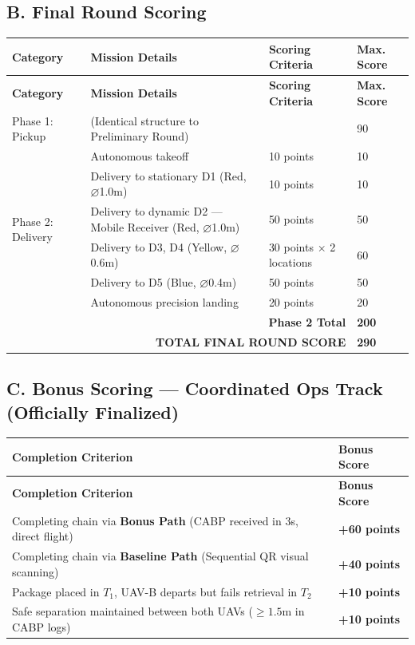 \documentclass[12pt,a4paper]{article}
\begin{document}
\subsection*{B. Final Round Scoring}
\begin{longtable}{p{3.0cm}p{6.0cm}p{3.8cm}p{1.6cm}}
\toprule
\textbf{Category} & \textbf{Mission Details} & \textbf{Scoring Criteria} & \textbf{Max. Score} \\
\midrule
\endfirsthead
\toprule
\textbf{Category} & \textbf{Mission Details} & \textbf{Scoring Criteria} & \textbf{Max. Score} \\
\midrule
\endhead
Phase 1: Pickup & (Identical structure to Preliminary Round) & & 90 \\
\midrule
\multirow{6}{3.0cm}{Phase 2: Delivery} & Autonomous takeoff & 10 points & 10 \\
 & Delivery to stationary D1 (Red, $\varnothing$1.0m) & 10 points & 10 \\
 & Delivery to dynamic D2 — Mobile Receiver (Red, $\varnothing$1.0m) & 50 points & 50 \\
 & Delivery to D3, D4 (Yellow, $\varnothing$0.6m) & 30 points $\times$ 2 locations & 60 \\
 & Delivery to D5 (Blue, $\varnothing$0.4m) & 50 points & 50 \\
 & Autonomous precision landing & 20 points & 20 \\
\midrule
\multicolumn{3}{r}{\textbf{Phase 2 Total}} & \textbf{200} \\
\midrule
\multicolumn{3}{r}{\textbf{TOTAL FINAL ROUND SCORE}} & \textbf{290} \\
\bottomrule
\end{longtable}

\subsection*{C. Bonus Scoring — Coordinated Ops Track (Officially Finalized)}
\begin{longtable}{p{10.5cm}p{3.5cm}}
\toprule
\textbf{Completion Criterion} & \textbf{Bonus Score} \\
\midrule
\endfirsthead
\toprule
\textbf{Completion Criterion} & \textbf{Bonus Score} \\
\midrule
\endhead
Completing chain via \textbf{Bonus Path} (CABP received in 3s, direct flight) & \textbf{+60 points} \\
Completing chain via \textbf{Baseline Path} (Sequential QR visual scanning) & \textbf{+40 points} \\
Package placed in $T_1$, UAV-B departs but fails retrieval in $T_2$ & \textbf{+10 points} \\
Safe separation maintained between both UAVs ($\ge 1.5$m in CABP logs) & \textbf{+10 points} \\
\bottomrule
\end{longtable}
\end{document}
